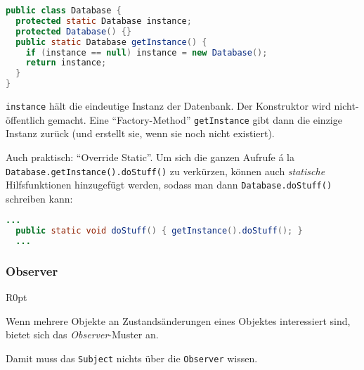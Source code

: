 \documentclass[german]{panikzettel}
\begin{document}
\begin{lstlisting}[language=Java]
public class Database {
  protected static Database instance;
  protected Database() {}
  public static Database getInstance() {
    if (instance == null) instance = new Database();
    return instance;
  }
}
\end{lstlisting}

\lstinline{instance} hält die eindeutige Instanz der Datenbank.
Der Konstruktor wird nicht-öffentlich gemacht.
Eine ``Factory-Method'' \lstinline{getInstance} gibt dann die einzige Instanz zurück (und erstellt sie, wenn sie noch nicht existiert).

Auch praktisch: ``Override Static''.
Um sich die ganzen Aufrufe á la \lstinline{Database.getInstance().doStuff()} zu verkürzen, können auch \emph{statische} Hilfsfunktionen hinzugefügt werden, sodass man dann \lstinline{Database.doStuff()} schreiben kann:

\begin{lstlisting}[language=Java]
  ...
  public static void doStuff() { getInstance().doStuff(); }
  ...
\end{lstlisting}

\subsubsection{Observer}

\begin{wrapfigure}[11]{R}{0pt}
\end{wrapfigure}

Wenn mehrere Objekte an Zustandsänderungen eines Objektes interessiert sind, bietet sich das \emph{Observer}-Muster an.

Damit muss das \lstinline{Subject} nichts über die \lstinline{Observer} wissen.
\end{document}

